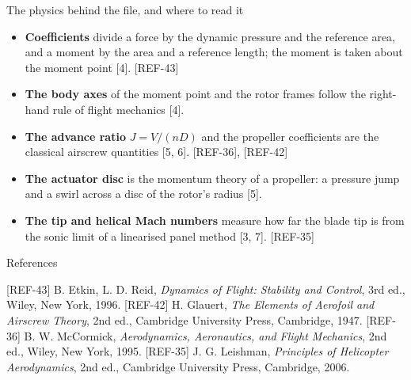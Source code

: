 %
\begin{frame}{The physics behind the file, and where to read it}
\begin{itemize}\small
  \item \textbf{Coefficients} divide a force by the dynamic pressure and the
        reference area, and a moment by the area and a reference length; the
        moment is taken about the moment point [4]. [REF-43]
  \item \textbf{The body axes} of the moment point and the rotor frames
        follow the right-hand rule of flight mechanics [4].
  \item \textbf{The advance ratio} \(J = V/(nD)\) and the propeller
        coefficients are the classical airscrew quantities [5, 6]. [REF-36], [REF-42]
  \item \textbf{The actuator disc} is the momentum theory of a propeller: a
        pressure jump and a swirl across a disc of the rotor's radius [5].
  \item \textbf{The tip and helical Mach numbers} measure how far the blade
        tip is from the sonic limit of a linearised panel method [3, 7]. [REF-35]
\end{itemize}
\end{frame}

\begin{frame}{References}
\begin{reflist}
 
 
 
 [REF-43] B. Etkin, L. D. Reid, \emph{Dynamics of Flight: Stability and
      Control}, 3rd ed., Wiley, New York, 1996.
 [REF-42] H. Glauert, \emph{The Elements of Aerofoil and Airscrew Theory}, 2nd
      ed., Cambridge University Press, Cambridge, 1947.
 [REF-36] B. W. McCormick, \emph{Aerodynamics, Aeronautics, and Flight
      Mechanics}, 2nd ed., Wiley, New York, 1995.
 [REF-35] J. G. Leishman, \emph{Principles of Helicopter Aerodynamics}, 2nd
      ed., Cambridge University Press, Cambridge, 2006.
\end{reflist}
\end{frame}
